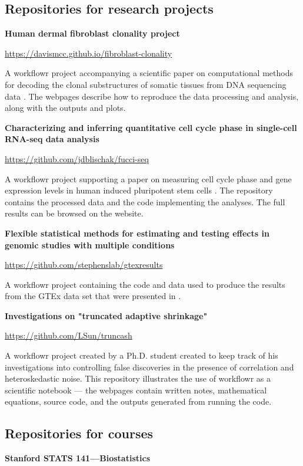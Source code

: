 \documentclass[9pt,a4paper]{extarticle}
\begin{document}
\subsection*{Repositories for research projects}

\textbf{Human dermal fibroblast clonality project}

\url{https://davismcc.github.io/fibroblast-clonality}

A workflowr project accompanying a scientific paper on computational
methods for decoding the clonal substructures of somatic tissues from
DNA sequencing data \cite{McCarthy2018}. The webpages describe how to
reproduce the data processing and analysis, along with the outputs and
plots.

\textbf{Characterizing and inferring quantitative cell cycle phase in
single-cell RNA-seq data analysis}

\url{https://github.com/jdblischak/fucci-seq}

A workflowr project supporting a paper on measuring cell cycle phase and
gene expression levels in human induced pluripotent stem cells
\cite{Hsiao2019}. The repository contains the processed data and the
code implementing the analyses. The full results can be browsed on the
website.

\textbf{Flexible statistical methods for estimating and testing effects
in genomic studies with multiple conditions}

\url{https://github.com/stephenslab/gtexresults}

A workflowr project containing the code and data used to produce the
results from the GTEx data set that were presented in \cite{Urbut2019}.

\textbf{Investigations on "truncated adaptive shrinkage"}

\url{https://github.com/LSun/truncash}

A workflowr project created by a Ph.D. student created to keep track of
his investigations into controlling false discoveries in the presence of
correlation and heteroskedastic noise. This repository illustrates the
use of workflowr as a scientific notebook --- the webpages contain
written notes, mathematical equations, source code, and the outputs
generated from running the code.

\subsection*{Repositories for courses}

\textbf{Stanford STATS 141—Biostatistics}
\end{document}
